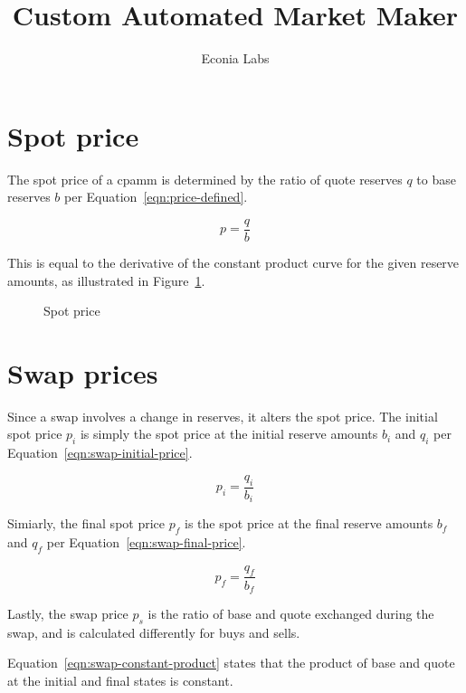 \documentclass[table, twocolumn]{article}
\title{Custom Automated Market Maker}
\author{Econia Labs}
\date{}
\begin{document}

\maketitle

\section{Spot price}\label{sec:spot-price}

The spot price of a \gls*{cpamm} is determined by the ratio of quote reserves $q$ to
base reserves $b$ per Equation~\ref{eqn:price-defined}.

\begin{equation}\label{eqn:price-defined}
	p = \frac{q}{b}
\end{equation}

This is equal to the derivative of the constant product curve for the given reserve
amounts, as illustrated in Figure~\ref{fig:spot-price}.

\begin{figure}[!htb]
	\centering
	
	\caption{Spot price}\label{fig:spot-price}
\end{figure}

\section{Swap prices}\label{sec:swap-prices}

Since a swap involves a change in reserves, it alters the spot price. The initial spot
price $p_i$ is simply the spot price at the initial reserve amounts $b_i$ and $q_i$ per
Equation~\ref{eqn:swap-initial-price}.

\begin{equation}\label{eqn:swap-initial-price}
  p_i = \frac{q_i}{b_i}
\end{equation}

Simiarly, the final spot price $p_f$ is the spot price at the final reserve amounts
$b_f$ and $q_f$ per Equation~\ref{eqn:swap-final-price}.

\begin{equation}\label{eqn:swap-final-price}
  p_f = \frac{q_f}{b_f}
\end{equation}

Lastly, the swap price $p_s$ is the ratio of base and quote exchanged during the swap,
and is calculated differently for buys and sells.

Equation~\ref{eqn:swap-constant-product} states that the product of base and quote at
the initial and final states is constant.
\end{document}
